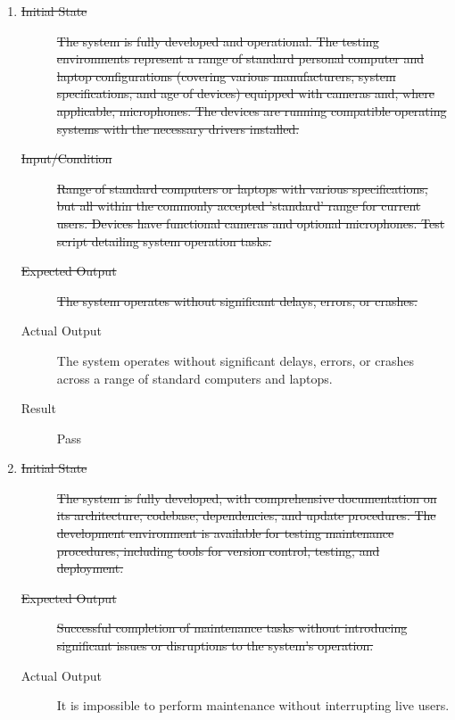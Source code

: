 \documentclass[12pt, titlepage]{article}
\begin{document}
\begin{enumerate}[NFR-T1]
  \item \label{NFRT18}
    \begin{description}
    \item[\sout{Initial State}]\sout{ The system is fully developed and operational. The testing
      environments represent a range of standard personal computer and laptop
      configurations (covering various manufacturers, system specifications, and
      age of devices) equipped with cameras and, where applicable, microphones.
      The devices are running compatible operating systems with the necessary
      drivers installed.
    }
		\item[\sout{Input/Condition}]\sout{ Range of standard computers or laptops with various
      specifications, but all within the commonly accepted 'standard' range for
      current users. Devices have functional cameras and optional microphones.
      Test script detailing system operation tasks.
    }
		\item[\sout{Expected Output}]\sout{ The system operates without significant delays, errors,
      or crashes.
    }
		\item[Actual Output] The system operates without significant delays, errors, or
      crashes across a range of standard computers and laptops.
    \item[Result] Pass
    \end{description}
  \item \label{NFRT19}
    \begin{description}
    \item[\sout{Initial State}]\sout{ The system is fully developed, with comprehensive
      documentation on its architecture, codebase, dependencies, and update
      procedures. The development environment is available for testing
      maintenance procedures, including tools for version control, testing, and
      deployment.
    }
		\item[\sout{Expected Output}]\sout{ Successful completion of maintenance tasks without
      introducing significant issues or disruptions to the system's operation.
    }
		\item[Actual Output] It is impossible to perform maintenance without
      interrupting live users.

\end{description}
\end{enumerate}
\end{document}
